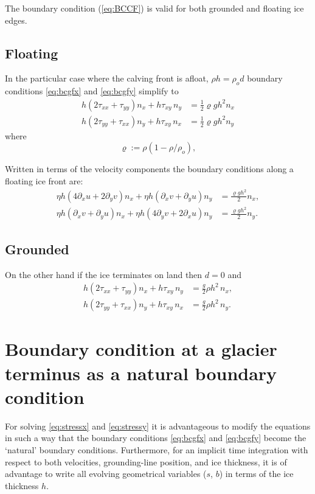 \documentclass[10pt,a4paper]{book}
\newcommand{\p}{\partial}
\newcommand{\txx}{\tau_{xx}}
\newcommand{\tyy}{\tau_{yy}}
\newcommand{\txy}{\tau_{xy}}
\begin{document}
The boundary condition (\ref{eq:BCCF}) is valid for both grounded and floating ice edges.



\subsection{Floating} 
In the particular case where the calving front is afloat, $\rho h
=\rho_o d$ boundary conditions \eqref{eq:bcgfx} and
\eqref{eq:bcgfy} simplify to
\begin{align}
h (2 \txx + \tyy) n_x + h \txy \,n_y &= \frac{1}{2} \varrho g h^2   n_x \label{eq:bgfxfloat} \\
h (2 \tyy + \txx) n_y + h \txy \,n_x &= \frac{1}{2} \varrho g h^2   n_y \label{eq:bgfyfloat} 
\end{align}
where
\[
\varrho:=\rho (1-\rho/\rho_o) ,
\]

Written in terms of the velocity components the boundary conditions along a floating ice front are:
\begin{align}
  \eta h (4 \p_x u + 2  \p_y v) n_x + \eta h (\p_x v +\p_y u) n_y &= \frac{\varrho g h^2 }{2}  n_x,\\
\eta h (\p_x v + \p_y u) n_x + \eta h ( 4 \p_y v + 2 \p_x u) n_y &= \frac{\varrho g h^2 }{2}  n_y.
\end{align}

\subsection{Grounded} 
On the other hand if the ice terminates on land then $d=0$ and 
\begin{align}
h (2 \txx + \tyy) n_x + h \txy \,n_y &=  \frac{g}{2} \rho h^2 \, n_x ,\label{eq:bcgfxgrounded} \\
h (2 \tyy + \txx) n_y + h \txy \, n_x &=  \frac{g}{2} \rho h^2 \, n_y .\label{eq:bcgfygrounded} 
\end{align}

\section{Boundary condition at a glacier terminus as a natural boundary condition}
\label{sec:BCNC}

For solving \eqref{eq:stressx} and \eqref{eq:stressy} it is
advantageous to modify the equations in such a way that the boundary
conditions \eqref{eq:bcgfx} and \eqref{eq:bcgfy} become the `natural'
boundary conditions. Furthermore, for an implicit time integration
with respect to both velocities, grounding-line position, and ice
thickness, it is of advantage to write all evolving geometrical
variables ($s$, $b$) in terms of the ice thickness $h$.
\end{document}
